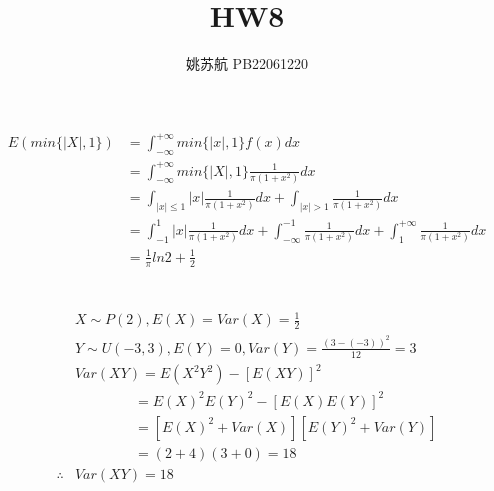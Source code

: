 \documentclass{article}
\title{HW8}
\author{姚苏航 PB22061220}
\begin{document}
\maketitle

\section{ }
\begin{equation}
    \begin{aligned}
        E(min\{|X|,1\}) & =\int_{-\infty}^{+\infty}min\{|x|,1\}f(x)dx \\
        &= \int_{-\infty}^{+\infty}min\{|X|,1\}\frac{1}{\pi(1+x^2)}dx\nonumber\\
        &=\int_{|x|\le1}|x|\frac{1}{\pi(1+x^2)}dx+\int_{|x|>1}\frac{1}{\pi(1+x^2)}dx\\
        &=\int_{-1}^{1}|x|\frac{1}{\pi(1+x^2)}dx+\int_{-\infty}^{-1}\frac{1}{\pi(1+x^2)}dx
        +\int_{1}^{+\infty}\frac{1}{\pi(1+x^2)}dx\\
        &=\frac{1}{\pi}ln2+\frac{1}{2}
    \end{aligned}
\end{equation}

\section{ }

\begin{equation}
    \begin{aligned}
        &X\sim P(2),E(X)=Var(X)=\frac{1}{2}\\
        &Y\sim U(-3,3),E(Y)=0,Var(Y)=\frac{(3-(-3))^2}{12}=3\\
        &Var(XY)=E(X^2Y^2)-[E(XY)]^2\\
        &\qquad\qquad\ =E(X)^2E(Y)^2-[E(X)E(Y)]^2\\
        &\qquad\qquad\ =[E(X)^2+Var(X)][E(Y)^2+Var(Y)]\\\nonumber
        &\qquad\qquad\ =(2+4)(3+0)=18\\
        \therefore&Var(XY)=18
    \end{aligned}
\end{equation}

\section{ }
\end{document}
